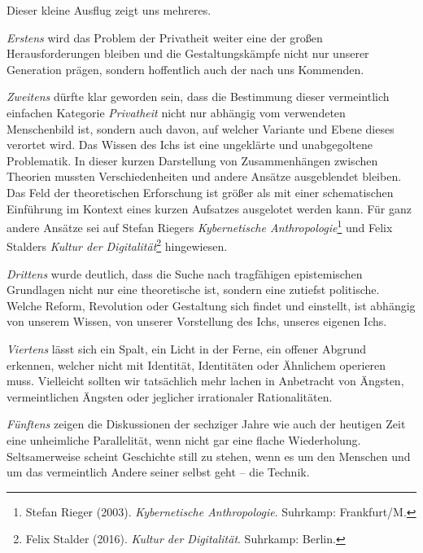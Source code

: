 \documentclass[12pt,a4paper]{article}
\begin{document}
Dieser kleine Ausflug zeigt uns mehreres.

\emph{Erstens} wird das Problem der Privatheit weiter eine der großen
Herausforderungen bleiben und die Gestaltungskämpfe nicht nur unserer
Generation prägen, sondern hoffentlich auch der nach uns Kommenden.

\emph{Zweitens} dürfte klar geworden sein, dass die Bestimmung dieser
vermeintlich einfachen Kategorie \emph{Privatheit} nicht nur abhängig vom
verwendeten Menschenbild ist, sondern auch davon, auf welcher Variante und
Ebene dieses verortet wird. Das Wissen des Ichs ist eine ungeklärte und
unabgegoltene Problematik. In dieser kurzen Darstellung von Zusammenhängen
zwischen Theorien mussten Verschiedenheiten und andere Ansätze ausgeblendet
bleiben. Das Feld der theoretischen Erforschung ist größer als mit einer
schematischen Einführung im Kontext eines kurzen Aufsatzes ausgelotet werden
kann. Für ganz andere Ansätze sei auf Stefan Riegers \emph{Kybernetische
  Anthropologie}\footnote{Stefan Rieger (2003). \emph{Kybernetische
    Anthropologie}. Suhrkamp: Frankfurt/M.}  und Felix Stalders \emph{Kultur
  der Digitalität}\footnote{Felix Stalder (2016). \emph{Kultur der
    Digitalität}. Suhrkamp: Berlin.} hingewiesen.

\emph{Drittens} wurde deutlich, dass die Suche nach tragfähigen epistemischen
Grundlagen nicht nur eine theoretische ist, sondern eine zutiefst politische.
Welche Reform, Revolution oder Gestaltung sich findet und einstellt, ist
abhängig von unserem Wissen, von unserer Vorstellung des Ichs, unseres eigenen
Ichs.

\emph{Viertens} lässt sich ein Spalt, ein Licht in der Ferne, ein offener
Abgrund erkennen, welcher nicht mit Identität, Identitäten oder Ähnlichem
operieren muss. Vielleicht sollten wir tatsächlich mehr lachen in Anbetracht
von Ängsten, vermeintlichen Ängsten oder jeglicher irrationaler
Rationalitäten.

\emph{Fünftens} zeigen die Diskussionen der sechziger Jahre wie auch der
heutigen Zeit eine unheimliche Parallelität, wenn nicht gar eine flache
Wiederholung. Seltsamerweise scheint Geschichte still zu stehen, wenn es um
den Menschen und um das vermeintlich Andere seiner selbst geht -- die Technik.
\end{document}
